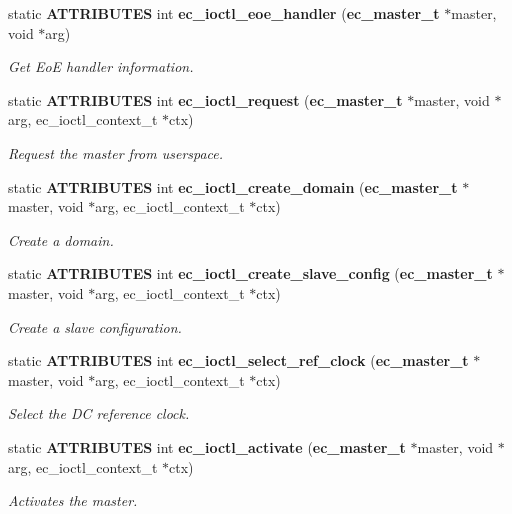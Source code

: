 \begin{DoxyCompactItemize}
static {\bf \-A\-T\-T\-R\-I\-B\-U\-T\-E\-S} int {\bf ec\-\_\-ioctl\-\_\-eoe\-\_\-handler} ({\bf ec\-\_\-master\-\_\-t} $\ast$master, void $\ast$arg)
\begin{DoxyCompactList}\small\item\em \-Get \-Eo\-E handler information. \end{DoxyCompactList}\item 
static {\bf \-A\-T\-T\-R\-I\-B\-U\-T\-E\-S} int {\bf ec\-\_\-ioctl\-\_\-request} ({\bf ec\-\_\-master\-\_\-t} $\ast$master, void $\ast$arg, ec\-\_\-ioctl\-\_\-context\-\_\-t $\ast$ctx)
\begin{DoxyCompactList}\small\item\em \-Request the master from userspace. \end{DoxyCompactList}\item 
static {\bf \-A\-T\-T\-R\-I\-B\-U\-T\-E\-S} int {\bf ec\-\_\-ioctl\-\_\-create\-\_\-domain} ({\bf ec\-\_\-master\-\_\-t} $\ast$master, void $\ast$arg, ec\-\_\-ioctl\-\_\-context\-\_\-t $\ast$ctx)
\begin{DoxyCompactList}\small\item\em \-Create a domain. \end{DoxyCompactList}\item 
static {\bf \-A\-T\-T\-R\-I\-B\-U\-T\-E\-S} int {\bf ec\-\_\-ioctl\-\_\-create\-\_\-slave\-\_\-config} ({\bf ec\-\_\-master\-\_\-t} $\ast$master, void $\ast$arg, ec\-\_\-ioctl\-\_\-context\-\_\-t $\ast$ctx)
\begin{DoxyCompactList}\small\item\em \-Create a slave configuration. \end{DoxyCompactList}\item 
static {\bf \-A\-T\-T\-R\-I\-B\-U\-T\-E\-S} int {\bf ec\-\_\-ioctl\-\_\-select\-\_\-ref\-\_\-clock} ({\bf ec\-\_\-master\-\_\-t} $\ast$master, void $\ast$arg, ec\-\_\-ioctl\-\_\-context\-\_\-t $\ast$ctx)
\begin{DoxyCompactList}\small\item\em \-Select the \-D\-C reference clock. \end{DoxyCompactList}\item 
static {\bf \-A\-T\-T\-R\-I\-B\-U\-T\-E\-S} int {\bf ec\-\_\-ioctl\-\_\-activate} ({\bf ec\-\_\-master\-\_\-t} $\ast$master, void $\ast$arg, ec\-\_\-ioctl\-\_\-context\-\_\-t $\ast$ctx)
\begin{DoxyCompactList}\small\item\em \-Activates the master. \end{DoxyCompactList}\item 

\end{DoxyCompactItemize}
